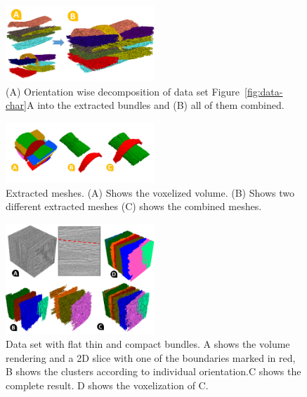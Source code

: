 %	


\begin{figure}[h]
\centering
	\includegraphics[width=0.5\textwidth]{imagesMT2014/all_clusters.PNG}
	\caption{(A) Orientation wise decomposition of data set Figure~\ref{fig:data-char}A into the extracted bundles and (B) all of them combined.}
	\label{fig:crop-16-decomp}
\end{figure}
\begin{figure}[h]
  \centering
   \includegraphics[width=0.5\textwidth]{imagesMT2014/mesh_2_C.png}
   \caption{Extracted meshes. (A) Shows the voxelized volume. (B) Shows two different extracted meshes (C) shows the combined meshes.}
   \label{fig:mesh}
   \end{figure}
\begin{figure}
\centering
	\includegraphics[width=0.5\textwidth]{imagesMT2014/crop-6-J_2.PNG}
	\caption{Data set with flat thin and compact bundles. A shows the volume rendering and a 2D slice with one of the boundaries marked in red, B shows the clusters according to individual orientation.C shows the complete result. D shows the voxelization of C.}
	\label{fig:prepreg}
\end{figure}
